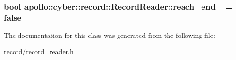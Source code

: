\hypertarget{classapollo_1_1cyber_1_1record_1_1RecordReader_a16344f4c5f6fd93fdc159adf7dcd433c}{
\subsubsection[{reach\-\_\-end\-\_\-}]{\setlength{\rightskip}{0pt plus 5cm}bool apollo\-::cyber\-::record\-::\-Record\-Reader\-::reach\-\_\-end\-\_\- = false\hspace{0.3cm}{\ttfamily [private]}}}\label{classapollo_1_1cyber_1_1record_1_1RecordReader_a16344f4c5f6fd93fdc159adf7dcd433c}


The documentation for this class was generated from the following file\-:\begin{DoxyCompactItemize}
\item 
record/\hyperlink{record__reader_8h}{record\-\_\-reader.\-h}\end{DoxyCompactItemize}
